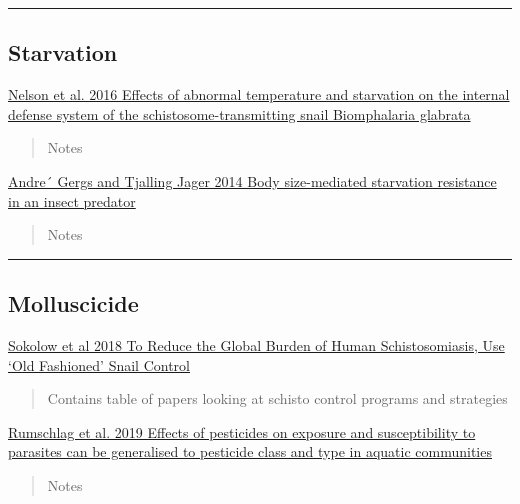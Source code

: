 \documentclass[10,portrait]{article}
\begin{document}
\newpage  

\begin{center}\rule{0.5\linewidth}{\linethickness}\end{center}

\subsection{Starvation}\label{starvation}

\href{https://www.ncbi.nlm.nih.gov/pmc/articles/PMC4945359/}{Nelson et
al. 2016 Effects of abnormal temperature and starvation on the internal
defense system of the schistosome-transmitting snail Biomphalaria
glabrata}

\begin{quote}
Notes
\end{quote}

\href{https://besjournals.onlinelibrary.wiley.com/doi/pdf/10.1111/1365-2656.12195}{Andre´
Gergs and Tjalling Jager 2014 Body size-mediated starvation resistance
in an insect predator}

\begin{quote}
Notes
\end{quote}

\newpage  

\begin{center}\rule{0.5\linewidth}{\linethickness}\end{center}

\subsection{Molluscicide}\label{molluscicide}

\href{}{Sokolow et al 2018 To Reduce the Global Burden of Human
Schistosomiasis, Use `Old Fashioned' Snail Control}

\begin{quote}
Contains table of papers looking at schisto control programs and
strategies
\end{quote}

\href{https://onlinelibrary.wiley.com/doi/pdf/10.1111/ele.13253}{Rumschlag
et al. 2019 Effects of pesticides on exposure and susceptibility to
parasites can be generalised to pesticide class and type in aquatic
communities}

\begin{quote}
Notes
\end{quote}

\newpage  
\end{document}
